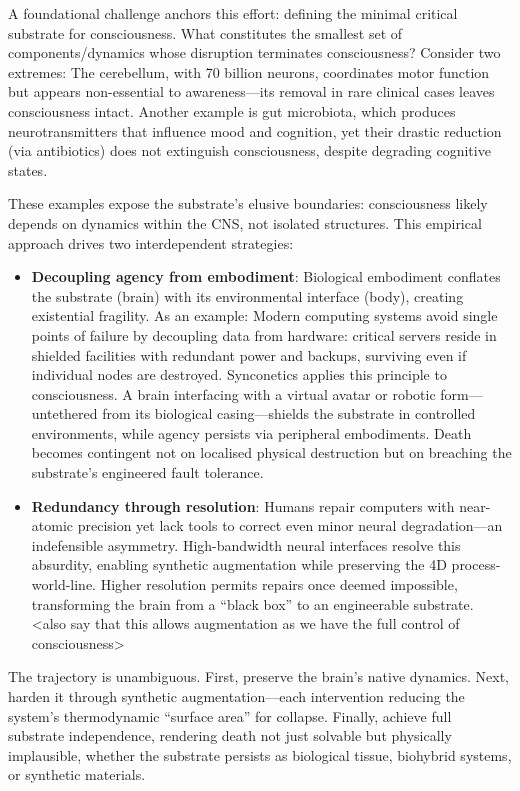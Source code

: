 \documentclass[10pt]{article}
\begin{document}
\begin{sloppypar}
  A foundational challenge anchors this effort: defining the minimal critical substrate for consciousness. What constitutes the smallest set of components/dynamics whose disruption terminates consciousness? Consider two extremes: The cerebellum, with 70 billion neurons, coordinates motor function but appears non-essential to awareness—its removal in rare clinical cases leaves consciousness intact. Another example is gut microbiota, which produces neurotransmitters that influence mood and cognition, yet their drastic reduction (via antibiotics) does not extinguish consciousness, despite degrading cognitive states.

  These examples expose the substrate’s elusive boundaries: consciousness likely depends on dynamics within the CNS, not isolated structures. This empirical approach drives two interdependent strategies:

  \begin{itemize}
    \item \textbf{Decoupling agency from embodiment}: Biological embodiment conflates the substrate (brain) with its environmental interface (body), creating existential fragility. As an example: Modern computing systems avoid single points of failure by decoupling data from hardware: critical servers reside in shielded facilities with redundant power and backups, surviving even if individual nodes are destroyed. Synconetics applies this principle to consciousness. A brain interfacing with a virtual avatar or robotic form—untethered from its biological casing—shields the substrate in controlled environments, while agency persists via peripheral embodiments. Death becomes contingent not on localised physical destruction but on breaching the substrate’s engineered fault tolerance.
    \item \textbf{Redundancy through resolution}: Humans repair computers with near-atomic precision yet lack tools to correct even minor neural degradation—an indefensible asymmetry. High-bandwidth neural interfaces resolve this absurdity, enabling synthetic augmentation while preserving the 4D process-world-line. Higher resolution permits repairs once deemed impossible, transforming the brain from a “black box” to an engineerable substrate. <also say that this allows augmentation as we have the full control of consciousness>
  \end{itemize}

  The trajectory is unambiguous. First, preserve the brain’s native dynamics. Next, harden it through synthetic augmentation—each intervention reducing the system’s thermodynamic “surface area” for collapse. Finally, achieve full substrate independence, rendering death not just solvable but physically implausible, whether the substrate persists as biological tissue, biohybrid systems, or synthetic materials.


\end{sloppypar}
\end{document}
